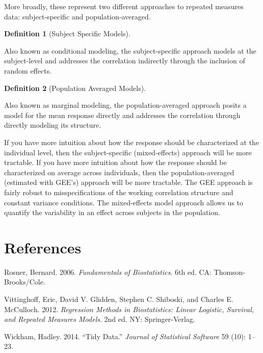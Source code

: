 \documentclass[
  letterpaper,
  DIV=11,
  numbers=noendperiod]{scrreprt}
\newlength{\cslhangindent}
\newlength{\cslentryspacingunit} %
\newenvironment{CSLReferences}[2] %
 {%
  \setlength{\parindent}{0pt}
  \ifodd #1
  \let\oldpar\par
  \def\par{\hangindent=\cslhangindent\oldpar}
  \fi
  \setlength{\parskip}{#2\cslentryspacingunit}
 }%
 {}
\theoremstyle{definition}
\theoremstyle{definition}
\newtheorem{definition}{Definition}[chapter]
\theoremstyle{remark}
\begin{document}
More broadly, these represent two different approaches to repeated
measures data: subject-specific and population-averaged.

\begin{definition}[Subject Specific
Models]\protect\hypertarget{def-subject-specific}{}\label{def-subject-specific}

Also known as conditional modeling, the subject-specific approach models
at the subject-level and addresses the correlation indirectly through
the inclusion of random effects.

\end{definition}

\begin{definition}[Population Averaged
Models]\protect\hypertarget{def-population-averaged}{}\label{def-population-averaged}

Also known as marginal modeling, the population-averaged approach posits
a model for the mean response directly and addresses the correlation
through directly modeling its structure.

\end{definition}

If you have more intuition about how the response should be
characterized at the individual level, then the subject-specific
(mixed-effects) approach will be more tractable. If you have more
intuition about how the response should be characterized on average
across individuals, then the population-averaged (estimated with GEE's)
approach will be more tractable. The GEE approach is fairly robust to
misspecifications of the working correlation structure and constant
variance conditions. The mixed-effects model approach allows us to
quantify the variability in an effect across subjects in the population.


\hypertarget{references}{%
\chapter*{References}\label{references}}


\hypertarget{refs}{}
\begin{CSLReferences}{1}{0}
\leavevmode{}%
Rosner, Bernard. 2006. \emph{Fundamentals of Biostatistics}. 6th ed. CA:
Thomson-Brooks/Cole.

\leavevmode{}%
Vittinghoff, Eric, David V. Glidden, Stephen C. Shiboski, and Charles E.
McCulloch. 2012. \emph{Regression Methods in Biostatistics: Linear
Logistic, Survival, and Repeated Measures Models}. 2nd ed. NY:
Springer-Verlag.

\leavevmode{}%
Wickham, Hadley. 2014. {``Tidy Data.''} \emph{Journal of Statistical
Software} 59 (10): 1--23.

\end{CSLReferences}
\end{document}
